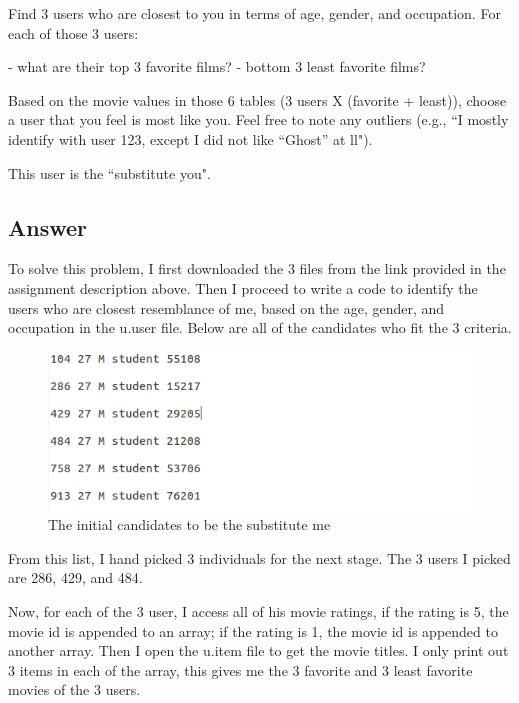 \documentclass[12pt]{article}
\begin{document}
\noindent
Find 3 users who are closest to you in terms of age, 
gender, and occupation.  For each of those 3 users:

\noindent
- what are their top 3 favorite films?
- bottom 3 least favorite films?

\noindent
Based on the movie values in those 6 tables (3 users X (favorite +
least)), choose a user that you feel is most like you.  Feel 
free to note any outliers (e.g., ``I mostly identify with user 123,
except I did not like ``Ghost'' at ll").  

\noindent
This user is the ``substitute you".  


\subsection*{Answer}
To solve this problem, I first downloaded the 3 files from the link provided in the assignment description above. Then I proceed to write a code to identify the users who are closest resemblance of me, based on the age, gender, and occupation in the u.user file. Below are all of the candidates who fit the 3 criteria.

\begin{figure}[h]
\centering
\includegraphics[width=6.5in]{inisub.png}
\caption{The initial candidates to be the substitute me}
\end{figure}



From this list, I hand picked 3 individuals for the next stage. The 3 users I picked are 286, 429, and 484.
 


Now, for each of the 3 user, I access all of his movie ratings, if the rating is 5, the movie id is appended to an array; if the rating is 1, the movie id is appended to another array. Then I open the u.item file to get the movie titles. I only print out 3 items in each of the array, this gives me the 3 favorite and 3 least favorite movies of the 3 users.
\newpage
\end{document}
